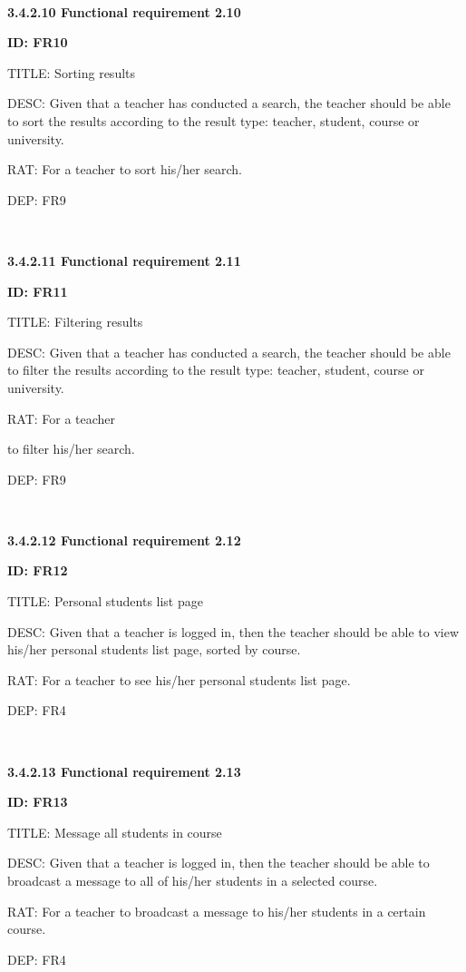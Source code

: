 \documentclass[12pt,a4paper]{article}
\begin{document}
\begin{flushleft}
        \

        \textbf{3.4.2.10 Functional requirement 2.10}

        \textbf{ID: FR10}

        TITLE: Sorting results

        DESC: Given that a teacher has conducted a search, the teacher should be
        able to sort the results according to the result type: teacher, student,
        course or university.

        RAT: For a teacher to sort his/her search.

        DEP: FR9

        \

        \textbf{3.4.2.11 Functional requirement 2.11}

        \textbf{ID: FR11}

        TITLE: Filtering results

        DESC: Given that a teacher has conducted a search, the teacher should be
        able to filter the results according to the result type: teacher,
        student, course or university.

        RAT: For a teacher

        to filter his/her search.

        DEP: FR9


        \
\newpage


        \textbf{3.4.2.12 Functional requirement 2.12}

        \textbf{ID: FR12}

        TITLE: Personal students list page

        DESC: Given that a teacher is logged in, then the teacher should be able
        to view his/her personal students list page, sorted by course.

        RAT: For a teacher to see his/her personal students list page.

        DEP: FR4

        \

        \textbf{3.4.2.13 Functional requirement 2.13}

        \textbf{ID: FR13}

        TITLE: Message all students in course

        DESC: Given that a teacher is logged in, then the teacher should be able
        to broadcast a message to all of his/her students in a selected course.

        RAT: For a teacher to broadcast a message to his/her students in a
        certain course.

        DEP: FR4

    \end{flushleft}

    \newpage
    
    
\end{document}
